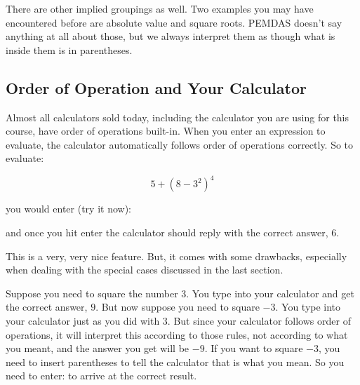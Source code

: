 There are other implied groupings as well. Two examples you may have encountered before are absolute value and square roots. PEMDAS doesn’t say anything at all about those, but we always interpret them as though what is inside them is in parentheses.



%
%

\subsection{Order of Operation and Your Calculator}

Almost all calculators sold today, including the calculator you are using for this course, have order of operations built-in. When you enter an expression to evaluate, the calculator automatically follows order of operations correctly. So to evaluate:

$$5+(8-3^2)^4$$

you would enter (try it now):


and once you hit enter the calculator should reply with the correct answer, $6$.

This is a very, very nice feature. But, it comes with some drawbacks, especially when dealing with the special cases discussed in the last section.

Suppose you need to square the number $3$. You type  into your calculator and get the correct answer, $9$. But now suppose you need to square $-3$. You type  into your calculator just as you did with $3$. But since your calculator follows order of operations, it will interpret this according to those rules, not according to what you meant, and the answer you get will be $-9$. If you want to square $-3$, you need to insert parentheses to tell the calculator that is what you mean. So you need to enter:
 to arrive at the correct result.

